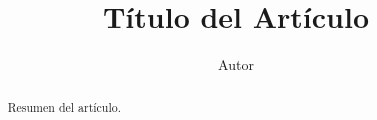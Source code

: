 \documentclass[preprint]{elsarticle}
\begin{document}
\begin{frontmatter}

\title{T\'itulo del Art\'iculo}

\author{Autor}

\begin{abstract}
Resumen del art\'iculo.
\end{abstract}

\end{frontmatter}










\end{document}
